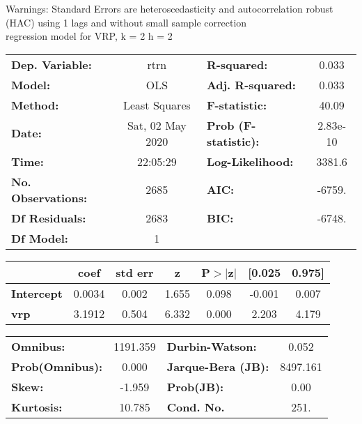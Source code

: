 Warnings: \newline
 [1] Standard Errors are heteroscedasticity and autocorrelation robust (HAC) using 1 lags and without small sample correction\\ 

regression model for VRP, k = 2 h = 2\begin{center}
\begin{tabular}{lclc}
\toprule
\textbf{Dep. Variable:}    &       rtrn       & \textbf{  R-squared:         } &     0.033   \\
\textbf{Model:}            &       OLS        & \textbf{  Adj. R-squared:    } &     0.033   \\
\textbf{Method:}           &  Least Squares   & \textbf{  F-statistic:       } &     40.09   \\
\textbf{Date:}             & Sat, 02 May 2020 & \textbf{  Prob (F-statistic):} &  2.83e-10   \\
\textbf{Time:}             &     22:05:29     & \textbf{  Log-Likelihood:    } &    3381.6   \\
\textbf{No. Observations:} &        2685      & \textbf{  AIC:               } &    -6759.   \\
\textbf{Df Residuals:}     &        2683      & \textbf{  BIC:               } &    -6748.   \\
\textbf{Df Model:}         &           1      & \textbf{                     } &             \\
\bottomrule
\end{tabular}
\begin{tabular}{lcccccc}
                   & \textbf{coef} & \textbf{std err} & \textbf{z} & \textbf{P$> |$z$|$} & \textbf{[0.025} & \textbf{0.975]}  \\
\midrule
\textbf{Intercept} &       0.0034  &        0.002     &     1.655  &         0.098        &       -0.001    &        0.007     \\
\textbf{vrp}       &       3.1912  &        0.504     &     6.332  &         0.000        &        2.203    &        4.179     \\
\bottomrule
\end{tabular}
\begin{tabular}{lclc}
\textbf{Omnibus:}       & 1191.359 & \textbf{  Durbin-Watson:     } &    0.052  \\
\textbf{Prob(Omnibus):} &   0.000  & \textbf{  Jarque-Bera (JB):  } & 8497.161  \\
\textbf{Skew:}          &  -1.959  & \textbf{  Prob(JB):          } &     0.00  \\
\textbf{Kurtosis:}      &  10.785  & \textbf{  Cond. No.          } &     251.  \\
\bottomrule
\end{tabular}
\end{center}

